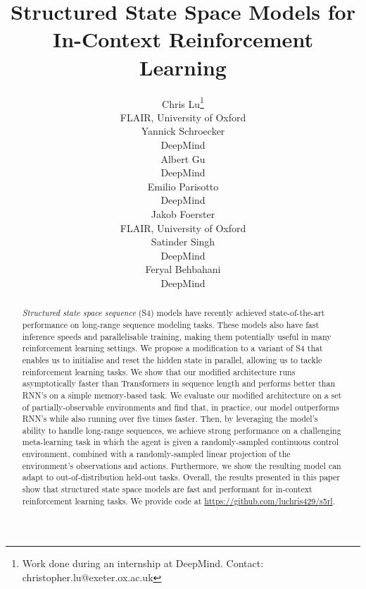 \documentclass{article}
\title{Structured State Space Models for In-Context Reinforcement Learning}
\author{
  Chris Lu\thanks{Work done during an internship at DeepMind. Contact: christopher.lu@exeter.ox.ac.uk} \\
  FLAIR, University of Oxford\\
  \And
  Yannick Schroecker \\
  DeepMind \\
  \And
  Albert Gu \\
  DeepMind \\
  \And
  Emilio Parisotto \\
  DeepMind \\
  \And
  Jakob Foerster \\
  FLAIR, University of Oxford \\
  \And
  Satinder Singh \\
  DeepMind \\
  \And
  Feryal Behbahani \\
  DeepMind \\
}
\begin{document}
\maketitle
\begin{abstract}
 \textit{Structured state space sequence} (S4) models have recently achieved state-of-the-art performance on long-range sequence modeling tasks. These models also have fast inference speeds and parallelisable training, making them potentially useful in many reinforcement learning settings. We propose a  modification to a variant of S4 that enables us to initialise and reset the hidden state in parallel, allowing us to tackle reinforcement learning tasks. We show that our modified architecture runs asymptotically faster than Transformers in sequence length and performs better than RNN's on a simple memory-based task. We evaluate our modified architecture on a set of partially-observable environments and find that, in practice, our model outperforms RNN's while also running over five times faster. Then, by leveraging the model’s ability to handle long-range sequences, we achieve strong performance on a challenging meta-learning task in which the agent is given a randomly-sampled continuous control environment, combined with a randomly-sampled linear projection of the environment's observations and actions. Furthermore, we show the resulting model can adapt to out-of-distribution held-out tasks. Overall, the results presented in this paper show that structured state space models are fast and performant for in-context reinforcement learning tasks. We provide code at \url{https://github.com/luchris429/s5rl}.
\end{abstract}
\end{document}

